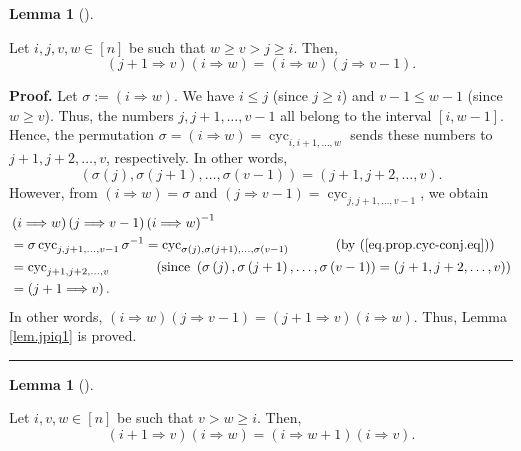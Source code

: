 \documentclass[numbers=enddot,12pt,final,onecolumn,notitlepage]{scrartcl}%
\theoremstyle{definition}
\newtheorem{lem}[theo]{Lemma}
\newenvironment{lemma}[1][]
{\begin{lem}[#1]\begin{leftbar}}
{\end{leftbar}\end{lem}}
\newenvironment{proof}[1][Proof]{\noindent\textbf{#1.} }{\ \rule{0.5em}{0.5em}}
\begin{document}
\begin{lemma}
\label{lem.jpiq1}Let $i,j,v,w\in\left[  n\right]  $ be such that $w\geq
v>j\geq i$. Then,%
\[
\left(  j+1\Longrightarrow v\right)  \left(  i\Longrightarrow w\right)
=\left(  i\Longrightarrow w\right)  \left(  j\Longrightarrow v-1\right)  .
\]

\end{lemma}

\begin{proof}
Let $\sigma:=\left(  i\Longrightarrow w\right)  $. We have $i\leq j$ (since
$j\geq i$) and $v-1\leq w-1$ (since $w\geq v$). Thus, the numbers
$j,j+1,\ldots,v-1$ all belong to the interval $\left[  i,w-1\right]  $. Hence,
the permutation $\sigma=\left(  i\Longrightarrow w\right)
=\operatorname*{cyc}\nolimits_{i,i+1,\ldots,w}$ sends these numbers to
$j+1,j+2,\ldots,v$, respectively. In other words,%
\[
\left(  \sigma\left(  j\right)  ,\sigma\left(  j+1\right)  ,\ldots
,\sigma\left(  v-1\right)  \right)  =\left(  j+1,j+2,\ldots,v\right)  .
\]
However, from $\left(  i\Longrightarrow w\right)  =\sigma$ and $\left(
j\Longrightarrow v-1\right)  =\operatorname*{cyc}\nolimits_{j,j+1,\ldots,v-1}%
$, we obtain%
\begin{align*}
&  \left(  i\Longrightarrow w\right)  \left(  j\Longrightarrow v-1\right)
\left(  i\Longrightarrow w\right)  ^{-1}\\
&  =\sigma\operatorname*{cyc}\nolimits_{j,j+1,\ldots,v-1}\sigma^{-1}%
=\operatorname*{cyc}\nolimits_{\sigma\left(  j\right)  ,\sigma\left(
j+1\right)  ,\ldots,\sigma\left(  v-1\right)  }\ \ \ \ \ \ \ \ \ \ \left(
\text{by (\ref{eq.prop.cyc-conj.eq})}\right) \\
&  =\operatorname*{cyc}\nolimits_{j+1,j+2,\ldots,v}\ \ \ \ \ \ \ \ \ \ \left(
\text{since }\left(  \sigma\left(  j\right)  ,\sigma\left(  j+1\right)
,\ldots,\sigma\left(  v-1\right)  \right)  =\left(  j+1,j+2,\ldots,v\right)
\right) \\
&  =\left(  j+1\Longrightarrow v\right)  .
\end{align*}
In other words, $\left(  i\Longrightarrow w\right)  \left(  j\Longrightarrow
v-1\right)  =\left(  j+1\Longrightarrow v\right)  \left(  i\Longrightarrow
w\right)  $. Thus, Lemma \ref{lem.jpiq1} is proved.
\end{proof}

\begin{lemma}
\label{lem.jpiq2}Let $i,v,w\in\left[  n\right]  $ be such that $v>w\geq i$.
Then,%
\[
\left(  i+1\Longrightarrow v\right)  \left(  i\Longrightarrow w\right)
=\left(  i\Longrightarrow w+1\right)  \left(  i\Longrightarrow v\right)  .
\]

\end{lemma}
\end{document}
